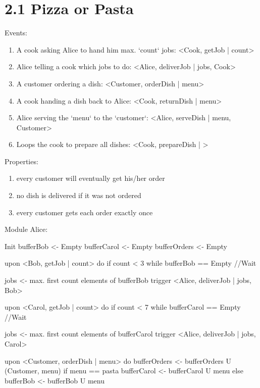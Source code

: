\documentclass{article}
\begin{document}
	\pagestyle{fancy}
	
    \section*{2.1 Pizza or Pasta}
    
        Events:
        \begin{enumerate}
            \item A cook asking Alice to hand him max. `count` jobs: <Cook, getJob | count>
            \item Alice telling a cook which jobs to do: <Alice, deliverJob | jobs, Cook>
            \item A customer ordering a dish: <Customer, orderDish | menu>
            \item A cook handing a dish back to Alice: <Cook, returnDish | menu>
            \item Alice serving the `menu` to the `customer`: <Alice, serveDish | menu, Customer>
            \item Loops the cook to prepare all dishes: <Cook, prepareDish | >
        \end{enumerate}

        Properties:
        \begin{enumerate}
            \item every customer will eventually get his/her order
            \item no dish is delivered if it was not ordered  
            \item every customer gets each order exactly once
        \end{enumerate}

        Module Alice:

Init
  bufferBob <- Empty
  bufferCarol <- Empty
  bufferOrders <- Empty

upon <Bob, getJob | count> do
  if count < 3
    while bufferBob == Empty
      //Wait

    jobs <- max. first count elements of bufferBob
    trigger <Alice, deliverJob | jobs, Bob>

upon <Carol, getJob | count> do
  if count < 7
    while bufferCarol == Empty
      //Wait

    jobs <- max. first count elements of bufferCarol
    trigger <Alice, deliverJob | jobs, Carol>

upon <Customer, orderDish | menu> do
  bufferOrders <- bufferOrders U (Customer, menu)
  if menu == pasta
    bufferCarol <- bufferCarol U menu
  else
    bufferBob <- bufferBob U menu
\end{document}
